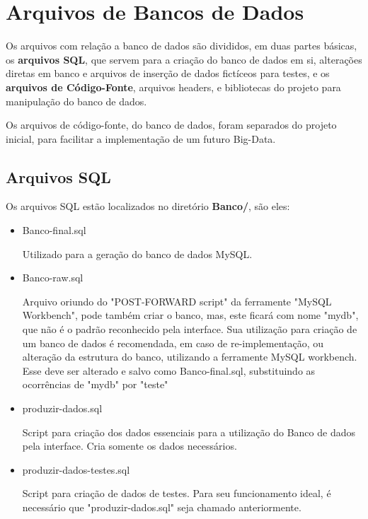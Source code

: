 \documentclass[onecolumn,12pt]{article}
\begin{document}
    	\section{Arquivos de Bancos de Dados}
    		Os arquivos com relação a banco de dados são divididos, em duas partes básicas, os \textbf{arquivos SQL}, que servem para a criação do banco de dados em si, alterações diretas em banco e arquivos de inserção de dados fictíceos para testes, e os \textbf{arquivos de Código-Fonte}, arquivos headers, e bibliotecas do projeto para manipulação do banco de dados.\par
    		Os arquivos de código-fonte, do banco de dados, foram separados do projeto inicial, para facilitar a implementação de um futuro Big-Data.
    		\subsection{Arquivos SQL}
    			Os arquivos SQL estão localizados no diretório \textbf{Banco/}, são eles:
    			\begin{itemize}
    				\item Banco-final.sql\par
    					Utilizado para a geração do banco de dados MySQL.
    				\item Banco-raw.sql\par
    					Arquivo oriundo do "POST-FORWARD script" da ferramente "MySQL Workbench", pode também criar o banco, mas, este ficará com nome "mydb", que não é o padrão reconhecido pela interface. Sua utilização para criação de um banco de dados é recomendada, em caso de re-implementação, ou alteração da estrutura do banco, utilizando a ferramente MySQL workbench. Esse deve ser alterado e salvo como Banco-final.sql, substituindo as ocorrências de "mydb" por "teste"
    				\item produzir-dados.sql\par
    					Script para criação dos dados essenciais para a utilização do Banco de dados pela interface. Cria somente os dados necessários.
    				\item produzir-dados-testes.sql\par
    					Script para criação de dados de testes. Para seu funcionamento ideal, é necessário que "produzir-dados.sql" seja chamado anteriormente.
    			\end{itemize}
\end{document}
